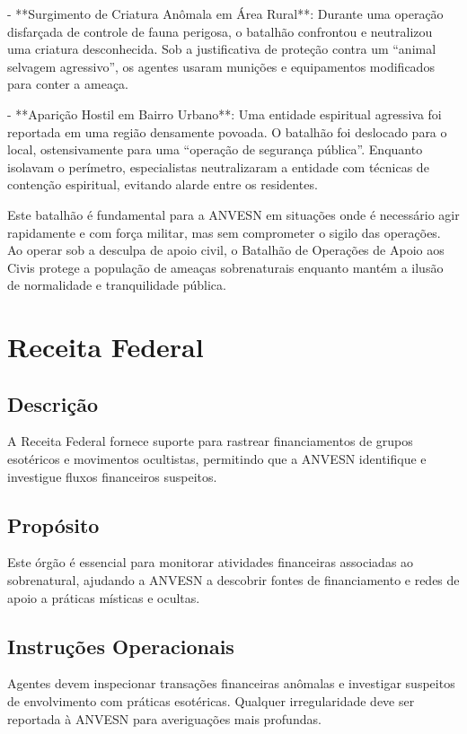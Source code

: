 \documentclass{book}
\begin{document}
- **Surgimento de Criatura Anômala em Área Rural**: Durante uma operação disfarçada de controle de fauna perigosa, o batalhão confrontou e neutralizou uma criatura desconhecida. Sob a justificativa de proteção contra um ``animal selvagem agressivo'', os agentes usaram munições e equipamentos modificados para conter a ameaça.

- **Aparição Hostil em Bairro Urbano**: Uma entidade espiritual agressiva foi reportada em uma região densamente povoada. O batalhão foi deslocado para o local, ostensivamente para uma ``operação de segurança pública''. Enquanto isolavam o perímetro, especialistas neutralizaram a entidade com técnicas de contenção espiritual, evitando alarde entre os residentes.

Este batalhão é fundamental para a ANVESN em situações onde é necessário agir rapidamente e com força militar, mas sem comprometer o sigilo das operações. Ao operar sob a desculpa de apoio civil, o Batalhão de Operações de Apoio aos Civis protege a população de ameaças sobrenaturais enquanto mantém a ilusão de normalidade e tranquilidade pública.



\chapter{Receita Federal}
\section{Descrição}
A Receita Federal fornece suporte para rastrear financiamentos de grupos esotéricos e movimentos ocultistas, permitindo que a ANVESN identifique e investigue fluxos financeiros suspeitos.

\section{Propósito}
Este órgão é essencial para monitorar atividades financeiras associadas ao sobrenatural, ajudando a ANVESN a descobrir fontes de financiamento e redes de apoio a práticas místicas e ocultas.

\section{Instruções Operacionais}
Agentes devem inspecionar transações financeiras anômalas e investigar suspeitos de envolvimento com práticas esotéricas. Qualquer irregularidade deve ser reportada à ANVESN para averiguações mais profundas.
\end{document}
